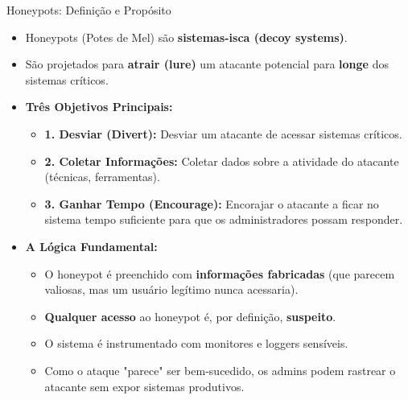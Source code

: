 \begin{frame}{Honeypots: Definição e Propósito}
    \begin{itemize}
        \item Honeypots (Potes de Mel) são \textbf{sistemas-isca (decoy systems)}.
        \item São projetados para \textbf{atrair (lure)} um atacante potencial para \textbf{longe} dos sistemas críticos.

        \item \textbf{Três Objetivos Principais:}
              \begin{itemize}
                  \item \textbf{1. Desviar (Divert):} Desviar um atacante de acessar sistemas críticos.
                  \item \textbf{2. Coletar Informações:} Coletar dados sobre a atividade do atacante (técnicas, ferramentas).
                  \item \textbf{3. Ganhar Tempo (Encourage):} Encorajar o atacante a ficar no sistema tempo suficiente para que os administradores possam responder.
              \end{itemize}

        \item \textbf{A Lógica Fundamental:}
              \begin{itemize}
                  \item O honeypot é preenchido com \textbf{informações fabricadas} (que parecem valiosas, mas um usuário legítimo nunca acessaria).
                  \item \textbf{Qualquer acesso} ao honeypot é, por definição, \textbf{suspeito}.
                  \item O sistema é instrumentado com monitores e loggers sensíveis.
                  \item Como o ataque "parece" ser bem-sucedido, os admins podem rastrear o atacante sem expor sistemas produtivos.
              \end{itemize}
    \end{itemize}
\end{frame}

